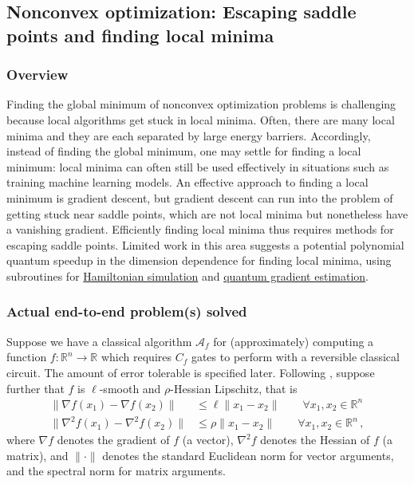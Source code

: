 \newpage


\begin{refsection}
\subsection{Nonconvex optimization: Escaping saddle points and finding local minima }\label{appl:EscapingSaddlePoints}

\subsubsection*{Overview}

Finding the global minimum of nonconvex optimization problems is challenging because local algorithms get stuck in local minima. Often, there are many local minima and they are each separated by large energy barriers. Accordingly, instead of finding the global minimum, one may settle for finding a local minimum: local minima can often still be used effectively in situations such as training machine learning models. An effective approach to finding a local minimum is gradient descent, but gradient descent can run into the problem of getting stuck near saddle points, which are not local minima but nonetheless have a vanishing gradient. Efficiently finding local minima thus requires methods for escaping saddle points. Limited work in this area suggests a potential polynomial quantum speedup \cite{zhang2021escapingSaddlePoints} in the dimension dependence for finding local minima, using subroutines for \hyperref[prim:HamiltonianSimulation]{Hamiltonian simulation} and \hyperref[prim:GradientEstimation]{quantum gradient estimation}.

\subsubsection*{Actual end-to-end problem(s) solved}

Suppose we have a classical algorithm $\mathcal{A}_f$ for (approximately) computing a function $f: \mathbb{R}^n \rightarrow \mathbb{R}$  which requires $C_f$ gates to perform with a reversible classical circuit. The amount of error tolerable is specified later. Following \cite{zhang2021escapingSaddlePoints}, suppose further that $f$ is $\ell$-smooth and $\rho$-Hessian Lipschitz, that is
\begin{align}
    \lVert \nabla f(x_1) - \nabla f(x_2) \rVert &\leq \ell \lVert x_1 - x_2 \rVert \qquad \forall x_1, x_2 \in \mathbb{R}^n \\
    \lVert \nabla^2 f(x_1) - \nabla^2 f(x_2) \rVert &\leq \rho \lVert x_1 - x_2 \rVert \qquad \forall x_1, x_2 \in \mathbb{R}^n \,,
\end{align}
where $\nabla f$ denotes the gradient of $f$ (a vector), $\nabla^2 f$ denotes the Hessian of $f$ (a matrix), and $\lVert \cdot \rVert$ denotes the standard Euclidean norm for vector arguments, and the spectral norm for matrix arguments. 


\end{refsection}
